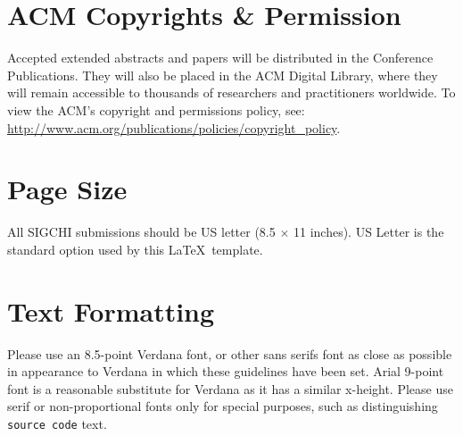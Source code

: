 \documentclass{sigchi-ext}
\begin{document}
\section{ACM Copyrights \& Permission}
Accepted extended abstracts and papers will be distributed in the
Conference Publications. They will also be placed in the ACM Digital
Library, where they will remain accessible to thousands of researchers
and practitioners worldwide. To view the ACM's copyright and
permissions policy, see:
\url{http://www.acm.org/publications/policies/copyright_policy}.


\section{Page Size}
All SIGCHI submissions should be US letter (8.5 $\times$ 11
inches). US Letter is the standard option used by this \LaTeX\
template.

\section{Text Formatting}
Please use an 8.5-point Verdana font, or other sans serifs font as
close as possible in appearance to Verdana in which these guidelines
have been set. Arial 9-point font is a reasonable substitute for
Verdana as it has a similar x-height. Please use serif or
non-proportional fonts only for special purposes, such as
distinguishing \texttt{source code} text.
\end{document}
